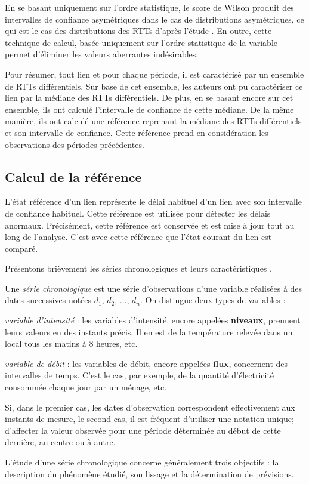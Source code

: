 En se basant uniquement sur l'ordre statistique, le score de Wilson produit des intervalles de confiance asymétriques dans le cas de distributions asymétriques, ce qui est le cas  des distributions des RTTs d'après l'étude \cite{DBLP:conf/infocom/FontugneMF15}. En outre, cette technique de calcul, basée uniquement sur l'ordre statistique de la variable permet d'éliminer les valeurs aberrantes indésirables.

Pour résumer, tout lien et pour chaque période, il est caractérisé par un ensemble de RTTs différentiels. Sur base de cet ensemble, les auteurs ont pu  caractériser ce lien par  la médiane  des RTTs différentiels.  De plus, en se basant encore sur cet ensemble, ils ont calculé l'intervalle de confiance de cette médiane. De la même manière, ils ont calculé une référence reprenant la médiane des RTTs différentiels et son intervalle de confiance. Cette référence prend en considération les observations des périodes précédentes.  

\subsection{Calcul de la référence} \label{reference-lissage}
L'état référence d'un lien représente le délai habituel d'un lien avec son intervalle de confiance habituel. Cette référence est utilisée pour détecter les délais anormaux. Précisément, cette référence est conservée  et  est mise à jour tout au long de l'analyse. C'est avec cette référence que l'état courant du lien est comparé. 

Présentons  brièvement  les séries chronologiques et leurs caractéristiques \cite{elementdestatistiques}.   
\begin{tcolorbox}[before upper={\parindent15pt}]
	Une \textit{série chronologique} est une série d'observations d'une variable réalisées à des dates successives notées $d_1$, $d_2$, ..., $d_n$. On distingue deux types de variables :
	
	\textit{variable  d'intensité} : les variables d'intensité, encore appelées \textbf{niveaux}, prennent leurs valeurs en des instants précis. Il en est de la température relevée dans un local tous les matins à $8$ heures, etc.
	
	\textit{variable de débit} : les variables de débit, encore appelées \textbf{flux}, concernent des intervalles de temps. C'est le cas, par exemple, de la quantité d'électricité consommée chaque jour par un ménage, etc.
	
	Si, dans le premier cas, les dates d'observation correspondent effectivement aux instants de mesure, le second cas, il est fréquent d'utiliser une notation unique; d'affecter la valeur observée pour une période déterminée au début de cette dernière, au centre ou à autre.
	
	L'étude d'une série chronologique concerne généralement trois objectifs : la description du phénomène étudié, son lissage et la détermination de prévisions.
\end{tcolorbox}

